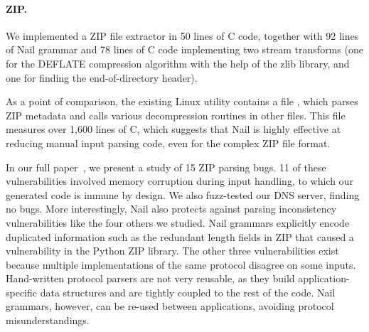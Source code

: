 \paragraph{ZIP\@.}

We implemented a ZIP file extractor in 50 lines of C code, together with
92 lines of Nail grammar and 78 lines of C code implementing two stream
transforms (one for the DEFLATE compression algorithm with the help of
the zlib library, and one for finding the end-of-directory header).

As a point of comparison, the existing Linux  utility contains a file , which parses
ZIP metadata and calls various decompression routines in other files. This
file measures over 1,600 lines of C, which suggests that Nail is highly
effective at reducing manual input parsing code, even for the complex
ZIP file format.

In our full paper~\cite{bangert:nail}, we present a study of 15 ZIP parsing bugs.
11 of these vulnerabilities involved memory corruption during input handling,
to which our generated code is immune by design.
We also fuzz-tested our DNS server, finding no bugs.
More interestingly, Nail also protects against parsing inconsistency vulnerabilities like the four others we studied.
Nail grammars explicitly encode duplicated information such as the redundant length fields in ZIP
that caused a vulnerability in the Python ZIP library. The other three vulnerabilities exist
because multiple implementations of the same protocol disagree on some inputs. Hand-written protocol
parsers are not very reusable, as they build application-specific data structures and are tightly
coupled to the rest of the code. Nail grammars, however, can be re-used between applications,
avoiding protocol misunderstandings.



